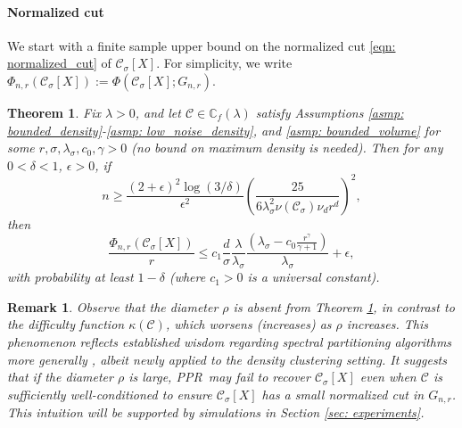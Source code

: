 \documentclass{article}
\newcommand{\1}{\mathbf{1}}
\newcommand{\Xbf}{X}             %
\newcommand{\Cbb}{\mathbb{C}}
\newcommand{\Cset}{\mathcal{C}}
\newcommand{\Csig}{\Cset_{\sigma}}
\newcommand{\pprspace}{{\sc PPR~}}
\theoremstyle{aldenthm}
\newtheorem{theorem}{Theorem}
\theoremstyle{aldenrmrk}
\newtheorem{remark}{Remark}
\begin{document}
\paragraph{Normalized cut} We start with a finite sample upper bound on the normalized cut \eqref{eqn: normalized_cut} of 
$\Cset_\sigma[\Xbf]$. For simplicity, we write $\Phi_{n,r}(\Csig[\Xbf]) := \Phi(\Csig[\Xbf]; G_{n,r})$.

\begin{theorem}
	\label{thm: conductance_upper_bound}
	Fix $\lambda > 0$, and let $\Cset \in \Cbb_f(\lambda)$ satisfy
	Assumptions \ref{asmp: bounded_density}-\ref{asmp: low_noise_density}, and \ref{asmp: bounded_volume} for some 
	$r, \sigma, \lambda_{\sigma}, c_0, \gamma > 0$ (no bound on maximum density is needed). 
	Then for any $0 < \delta < 1$, $\epsilon > 0$, if
	\begin{equation}
	\label{eqn: conductance_sample_complexity}
	n \geq \frac{(2+\epsilon)^2\log(3/\delta)}{\epsilon^2}\left(\frac{25}
	{6 \lambda_{\sigma}^2\nu(\Csig) \nu_d r^d}\right)^2,
	\end{equation}
	then
	\begin{equation}
	\label{eqn: conductance_additive_error_bound}
	\frac{\Phi_{n,r}(\Csig[\Xbf])}{r} \leq c_1 \frac{d}{\sigma}
	\frac{\lambda}{\lambda_{\sigma}} \frac{(\lambda_{\sigma} -
		c_0\frac{r^{\gamma}}{\gamma+1})}{\lambda_{\sigma}} + \epsilon, 
	\end{equation}
	with probability at least $1-\delta$ (where $c_1 > 0$ is a universal constant).
\end{theorem}

\begin{remark}
	\label{rmk: diameter}
	Observe that the diameter $\rho$ is absent from Theorem \ref{thm: conductance_upper_bound}, in contrast to the difficulty function $\kappa(\Cset)$, which worsens (increases) as $\rho$ increases. This phenomenon reflects established wisdom regarding spectral partitioning algorithms more generally \cite{guattery1995, hein2010}, albeit newly applied to the density clustering setting. It suggests that if the diameter $\rho$ is large, \pprspace may fail to recover $\Csig[\Xbf]$ even when $\Cset$ is sufficiently well-conditioned to ensure $\Csig[\Xbf]$ has a small normalized cut in $G_{n,r}$. This intuition will be supported by simulations in Section \ref{sec: experiments}.
\end{remark}
\end{document}
